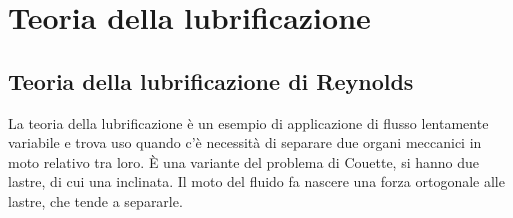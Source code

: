 %
\section{Teoria della lubrificazione}
\subsection{Teoria della lubrificazione di Reynolds}
La teoria della lubrificazione è un esempio di applicazione di flusso lentamente variabile e trova uso quando c'è necessità di separare due organi meccanici in moto relativo tra loro.
È una variante del problema di Couette, si hanno due lastre, di cui una inclinata.
Il moto del fluido fa nascere una forza ortogonale alle lastre, che tende a separarle.

